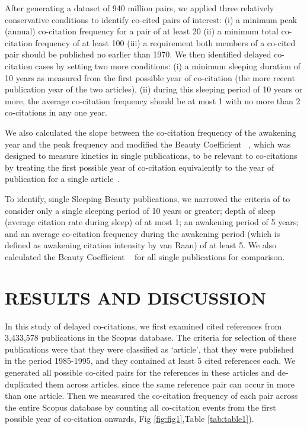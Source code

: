 \documentclass[11pt, oneside]{article}   	%
\begin{document}
After generating a dataset of 940 million pairs, we applied three relatively conservative conditions to identify co-cited pairs of interest: (i) a minimum peak (annual) co-citation frequency for a pair of at least 20 (ii) a minimum total co-citation frequency of at least 100 (iii) a requirement both members of a co-cited pair should be published no earlier than 1970. We then identified delayed co-citation cases by setting two more conditions: (i) a minimum sleeping duration of 10 years as measured from the first possible year of co-citation (the more recent publication year of the two articles), (ii) during this sleeping period of 10 years or more, the average co-citation frequency should be at most 1 with no more than 2 co-citations in any one year. 

We also calculated the slope between the co-citation frequency of the awakening year and the peak frequency and modified the Beauty Coefficient ~\citep{Ke2015,devarakonda_2020}, which was designed to measure kinetics in single publications, to be relevant to co-citations by treating the first possible year of co-citation equivalently to the year of publication for a single article~\citep{devarakonda_2020}. 

To identify, single Sleeping Beauty publications, we narrowed the criteria of \cite{Raan2019} to consider only a single sleeping period of 10 years or greater; depth of sleep (average citation rate during sleep) of at most 1; an awakening period of 5 years; and an average co-citation frequency during the awakening period (which is defined as awakening citation intensity by van Raan) of at least 5. We also calculated the Beauty Coefficient ~\citep{Ke2015} for all single publications for comparison.

\section{RESULTS AND DISCUSSION}

In this study of delayed co-citations, we first examined cited references from 3,433,578 publications in the Scopus database. The criteria for selection of these publications were that they were classified as `article', that they were published in the period 1985-1995, and they contained at least 5 cited references each. We generated all possible co-cited pairs for the references in these articles and de-duplicated them across articles. since the same reference pair can occur in more than one article. Then we measured the co-citation frequency of each pair across the entire Scopus database by counting all co-citation events from the first possible year of co-citation onwards, Fig \ref{fig:fig1},Table \ref{tab:table1}).
\end{document}
